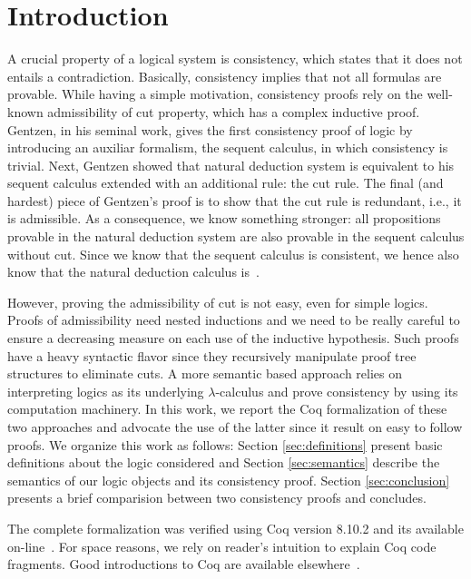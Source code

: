 \begin{coqdoccode}
\coqdocemptyline
\coqdocemptyline
\end{coqdoccode}
\section{Introduction}


A crucial property of a logical system is consistency, which states that it does not
entails a contradiction. Basically, consistency implies that not all formulas
are provable.  While having a simple motivation, consistency proofs rely on
the well-known admissibility of cut property, which has a complex inductive proof.
Gentzen, in his seminal work, gives the first consistency proof of logic by introducing an
auxiliar formalism, the sequent calculus, in which consistency is trivial. Next, Gentzen showed
that natural deduction system is equivalent to his sequent calculus extended with an
additional rule: the cut rule. The final (and hardest) piece of Gentzen's proof is to 
show that the cut rule is redundant, i.e., it is admissible. As a consequence, we know
something stronger: all propositions provable in the natural deduction system are also provable
in the sequent calculus without cut. Since we know that the sequent calculus is consistent,
we hence also know that the natural deduction calculus is~\cite{Negri2001}.


However, proving the admissibility of cut is not easy, even for simple logics.
Proofs of admissibility need nested inductions and we need to be really careful to
ensure a decreasing measure on each use of the inductive hypothesis. Such proofs have
a heavy syntactic flavor since they recursively manipulate proof tree structures to
eliminate cuts. A more semantic based approach relies on interpreting logics as its
underlying $\lambda$-calculus and prove consistency by using its computation machinery.
In this work, we report the Coq formalization of these two approaches and advocate the use
of the latter since it result on easy to follow proofs. We organize this work
as follows: Section \ref{sec:definitions} present basic definitions about the logic considered
and Section \ref{sec:semantics} describe the semantics of our logic objects and its
consistency proof. Section \ref{sec:conclusion} presents a brief comparision between
two consistency proofs and concludes.


The complete formalization was verified using Coq version 8.10.2 and its available
on-line~\cite{Sasdelli20}. For space reasons, we rely on reader's intuition to
explain Coq code fragments. Good introductions to Coq are available elsewhere~\cite{Chlipala13}.



